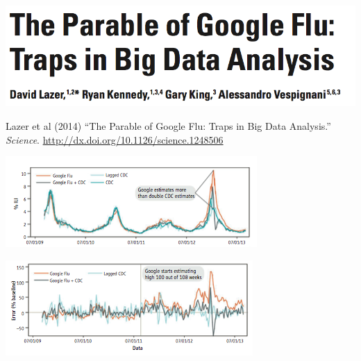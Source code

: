 \documentclass[aspectratio=169]{beamer}
\def\vf{\vfill}
\begin{document}
\begin{frame}

\begin{center}
\includegraphics[width=\textwidth]{figures/lazer_parable_2014_title}
\end{center}

\vf 
Lazer et al (2014) ``The Parable of Google Flu: Traps in Big Data Analysis.'' \textit{Science}. \url{http://dx.doi.org/10.1126/science.1248506}

\end{frame}
\begin{frame}

\begin{center}
\includegraphics[width=\textwidth]{figures/lazer_parable_2014_fig1a}
\end{center}

\end{frame}
\begin{frame}

\begin{center}
\includegraphics[width=\textwidth]{figures/lazer_parable_2014_fig1b}
\end{center}

\end{frame}
\end{document}
